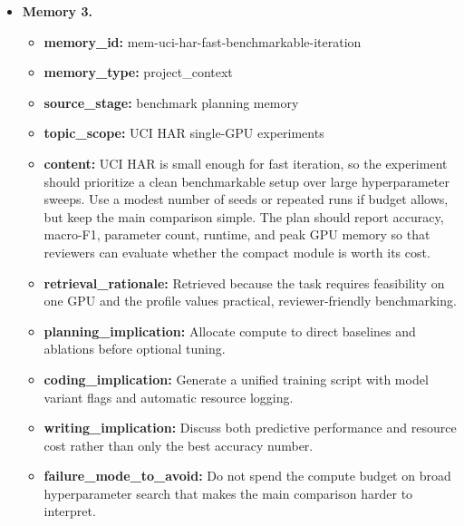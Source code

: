 \documentclass{opendatalab}
\begin{document}
\begin{tcolorbox}
\begin{itemize}
  \item \textbf{Memory 3.}
  \begin{itemize}\setlength\itemsep{1pt}
    \item \textbf{memory\_id:} mem-uci-har-fast-benchmarkable-iteration
    \item \textbf{memory\_type:} project\_context
    \item \textbf{source\_stage:} benchmark planning memory
    \item \textbf{topic\_scope:} UCI HAR single-GPU experiments
    \item \textbf{content:} UCI HAR is small enough for fast iteration, so the experiment should prioritize a clean benchmarkable setup over large hyperparameter sweeps. Use a modest number of seeds or repeated runs if budget allows, but keep the main comparison simple. The plan should report accuracy, macro-F1, parameter count, runtime, and peak GPU memory so that reviewers can evaluate whether the compact module is worth its cost.
    \item \textbf{retrieval\_rationale:} Retrieved because the task requires feasibility on one GPU and the profile values practical, reviewer-friendly benchmarking.
    \item \textbf{planning\_implication:} Allocate compute to direct baselines and ablations before optional tuning.
    \item \textbf{coding\_implication:} Generate a unified training script with model variant flags and automatic resource logging.
    \item \textbf{writing\_implication:} Discuss both predictive performance and resource cost rather than only the best accuracy number.
    \item \textbf{failure\_mode\_to\_avoid:} Do not spend the compute budget on broad hyperparameter search that makes the main comparison harder to interpret.
  \end{itemize}
\end{itemize}


\end{tcolorbox}
\end{document}

